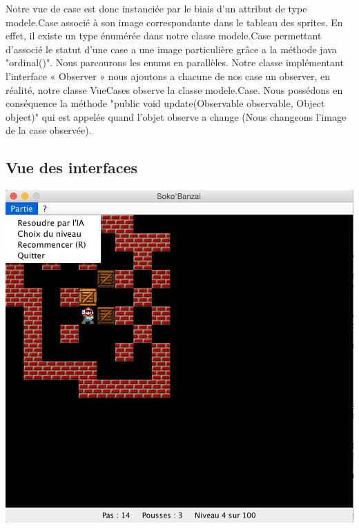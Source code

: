 \documentclass[a4paper,12pt]{article} %
\begin{document}
Notre vue de case est donc instanciée par le biais d’un attribut de type modele.Case associé à son image correspondante dans le tableau des sprites. En effet, il existe un type énumérée dans notre classe modele.Case permettant d’associé le statut d’une case a une image particulière grâce a la méthode java "ordinal()". Nous parcourons les enums en parallèles.
\newline\newline
Notre classe implémentant l’interface « Observer » nous ajoutons a chacune de nos case un observer, en réalité, notre classe VueCases observe la classe modele.Case.
\newline\newline
Nous possédons en conséquence la méthode "public void update(Observable observable, Object object)" qui est appelée quand l'objet observe a change (Nous changeons l’image de la case observée).
\newpage
\subsection{Vue des interfaces}

\begin{center} \includegraphics[scale=0.37]{menu.jpg} \end{center}
\end{document}
